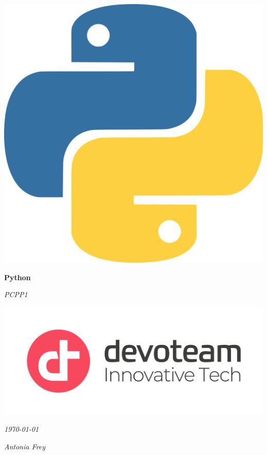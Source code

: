 \documentclass[11pt,a4paper,titlepage]{article}
\begin{document}
\begin{titlepage}
    \centering
    \vspace*{2cm}
    \includegraphics[width=0.2\linewidth]{images/python.png}\par
    \vspace{0.6cm}
    {\Huge\bfseries Python\par}
    \vspace{0.3cm}
    {\Large\itshape PCPP1\par}
    \vspace{1cm}
    \vfill
    \includegraphics[width=0.35\linewidth]{images/logo.png}\par
    \vspace{0.5cm}
    {\large\itshape \today\par}
    {\large\itshape Antonia Frey\par}
    \vspace*{2cm}
\end{titlepage}

\setcounter{tocdepth}{2} %
\tableofcontents
\newpage







\end{document}
